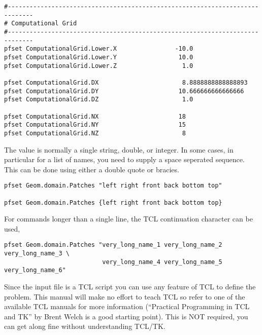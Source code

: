 \begin{display}\begin{verbatim}
#-----------------------------------------------------------------------------
# Computational Grid
#-----------------------------------------------------------------------------
pfset ComputationalGrid.Lower.X                -10.0
pfset ComputationalGrid.Lower.Y                 10.0
pfset ComputationalGrid.Lower.Z                  1.0
 
pfset ComputationalGrid.DX                       8.8888888888888893
pfset ComputationalGrid.DY                      10.666666666666666
pfset ComputationalGrid.DZ                       1.0
 
pfset ComputationalGrid.NX                      18
pfset ComputationalGrid.NY                      15
pfset ComputationalGrid.NZ                       8

\end{verbatim}\end{display}

The value is normally a single string, double, or integer.  In some cases,
in particular for a list of names, you need to supply a space seperated
sequence.  This can be done using either a double quote or bracies.

\begin{display}\begin{verbatim}
pfset Geom.domain.Patches "left right front back bottom top"

pfset Geom.domain.Patches {left right front back bottom top}
\end{verbatim}\end{display}

For commands longer than a single line, the TCL continuation character can be
used, 
\begin{display}\begin{verbatim}
pfset Geom.domain.Patches "very_long_name_1 very_long_name_2 very_long_name_3 \
                           very_long_name_4 very_long_name_5 very_long_name_6"
\end{verbatim}\end{display}


Since the input file is a TCL script you can use any feature of TCL to
define the problem.  This manual will make no effort to teach TCL so
refer to one of the available TCL manuals for more information
(``Practical Programming in TCL and TK'' by Brent Welch \cite{welch.95} 
is a good starting point).  
This is NOT required, you can get along fine without understanding TCL/TK.


